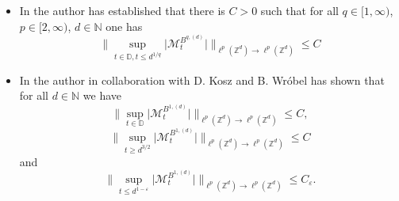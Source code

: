 \documentclass[a4paper,oneside, reqno]{amsart}
\numberwithin{equation}{section}
\theoremstyle{definition}%
\theoremstyle{definition}
\theoremstyle{definition}%
\theoremstyle{definition}
\newcommand{\Z}{\mathbb{Z}}
\newcommand{\D}{\mathbb{D}}
\newcommand{\N}{\mathbb{N}}
\begin{document}
\begin{itemize}
    \[
    \Big\| \sup_{0 \le t \le d^{\frac{1}{2}-\varepsilon}} \big|\mathcal{M}_t^{B^{2,(d)}}\big| \Big\|_{\ell^p(\Z^d) \to \ell^p(\Z ^d)} \le C_{\varepsilon}.
    \]
    \item In \cite{Ni2} the author has established that there is $C>0$ such that for all $q \in [1, \infty)$, $p \in [2, \infty)$, $d \in \N$ one has
    \[
    \Big\| \sup_{t \in \D, t \le d^{1/q}} \big| \mathcal{M}_t^{B^{q,(d)}} \big| \Big\|_{\ell^p(\Z^d) \to \ell^p(\Z ^d)} \le C
    \]
    \item In \cite{KNW} the author in collaboration with D. Kosz and B. Wróbel has shown that for all $d \in \N$ we have 
    \[
    \Big\| \sup_{t \in \D} \big| \mathcal{M}_t^{B^{1,(d)}} \big| \Big\|_{\ell^p(\Z^d) \to \ell^p(\Z ^d)} \le C ,
    \]
    \[
    \Big\| \sup_{t \ge d^{3/2}} \big| \mathcal{M}_t^{B^{1,(d)}} \big| \Big\|_{\ell^p(\Z^d) \to \ell^p(\Z ^d)} \le C 
    \]
    and
    \[
    \Big\| \sup_{t \le d^{1- \varepsilon}} \big| \mathcal{M}_t^{B^{1,(d)}} \big| \Big\|_{\ell^p(\Z^d) \to \ell^p(\Z ^d)} \le C_\varepsilon .
    \]
\end{itemize}
\end{document}
